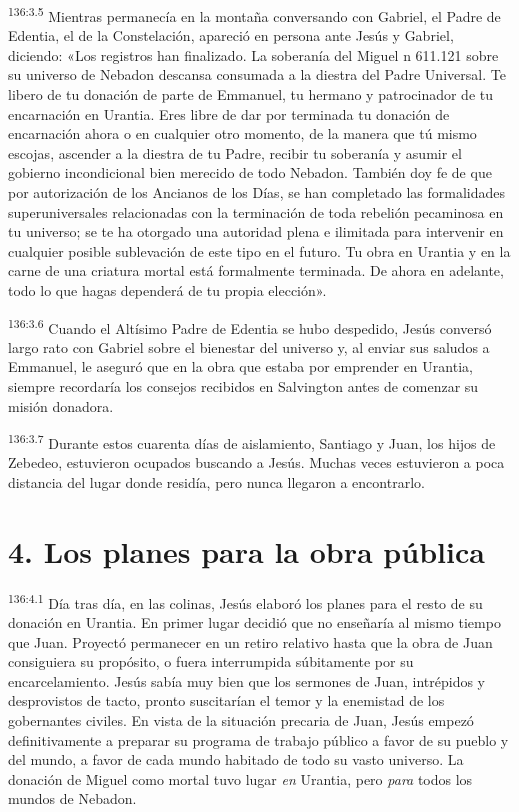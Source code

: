\par 
\textsuperscript{136:3.5} Mientras permanecía en la montaña conversando con Gabriel, el Padre de Edentia, el de la Constelación, apareció en persona ante Jesús y Gabriel, diciendo: «Los registros han finalizado. La soberanía del Miguel n{\textordmasculine} 611.121 sobre su universo de Nebadon descansa consumada a la diestra del Padre Universal. Te libero de tu donación de parte de Emmanuel, tu hermano y patrocinador de tu encarnación en Urantia. Eres libre de dar por terminada tu donación de encarnación ahora o en cualquier otro momento, de la manera que tú mismo escojas, ascender a la diestra de tu Padre, recibir tu soberanía y asumir el gobierno incondicional bien merecido de todo Nebadon. También doy fe de que por autorización de los Ancianos de los Días, se han completado las formalidades superuniversales relacionadas con la terminación de toda rebelión pecaminosa en tu universo; se te ha otorgado una autoridad plena e ilimitada para intervenir en cualquier posible sublevación de este tipo en el futuro. Tu obra en Urantia y en la carne de una criatura mortal está formalmente terminada. De ahora en adelante, todo lo que hagas dependerá de tu propia elección».

\par 
\textsuperscript{136:3.6} Cuando el Altísimo Padre de Edentia se hubo despedido, Jesús conversó largo rato con Gabriel sobre el bienestar del universo y, al enviar sus saludos a Emmanuel, le aseguró que en la obra que estaba por emprender en Urantia, siempre recordaría los consejos recibidos en Salvington antes de comenzar su misión donadora.

\par 
\textsuperscript{136:3.7} Durante estos cuarenta días de aislamiento, Santiago y Juan, los hijos de Zebedeo, estuvieron ocupados buscando a Jesús. Muchas veces estuvieron a poca distancia del lugar donde residía, pero nunca llegaron a encontrarlo.

\section*{4. Los planes para la obra pública}
\par 
\textsuperscript{136:4.1} Día tras día, en las colinas, Jesús elaboró los planes para el resto de su donación en Urantia. En primer lugar decidió que no enseñaría al mismo tiempo que Juan. Proyectó permanecer en un retiro relativo hasta que la obra de Juan consiguiera su propósito, o fuera interrumpida súbitamente por su encarcelamiento. Jesús sabía muy bien que los sermones de Juan, intrépidos y desprovistos de tacto, pronto suscitarían el temor y la enemistad de los gobernantes civiles. En vista de la situación precaria de Juan, Jesús empezó definitivamente a preparar su programa de trabajo público a favor de su pueblo y del mundo, a favor de cada mundo habitado de todo su vasto universo. La donación de Miguel como mortal tuvo lugar \textit{en} Urantia, pero \textit{para} todos los mundos de Nebadon.

